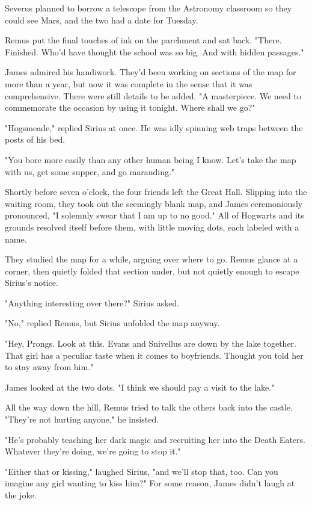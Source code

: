 \documentclass[a4paper,11pt]{article}
\begin{document}
Severus planned to borrow a telescope from the Astronomy classroom so they could see Mars, and the two had a date for Tuesday.

Remus put the final touches of ink on the parchment and sat back. "There. Finished. Who'd have thought the school was so big. And with hidden passages."

James admired his handiwork. They'd been working on sections of the map for more than a year, but now it was complete in the sense that it was comprehensive. There were still details to be added. "A masterpiece. We need to commemorate the occasion by using it tonight. Where shall we go?"

"Hogsmeade," replied Sirius at once. He was idly spinning web traps between the posts of his bed.

"You bore more easily than any other human being I know. Let's take the map with us, get some supper, and go marauding."

Shortly before seven o'clock, the four friends left the Great Hall. Slipping into the waiting room, they took out the seemingly blank map, and James ceremoniously pronounced, "I solemnly swear that I am up to no good." All of Hogwarts and its grounds resolved itself before them, with little moving dots, each labeled with a name.

They studied the map for a while, arguing over where to go. Remus glance at a corner, then quietly folded that section under, but not quietly enough to escape Sirius's notice.

"Anything interesting over there?" Sirius asked.

"No," replied Remus, but Sirius unfolded the map anyway.

"Hey, Prongs. Look at this. Evans and Snivellus are down by the lake together. That girl has a peculiar taste when it comes to boyfriends. Thought you told her to stay away from him."

James looked at the two dots. "I think we should pay a visit to the lake."

All the way down the hill, Remus tried to talk the others back into the castle. "They're not hurting anyone," he insisted.

"He's probably teaching her dark magic and recruiting her into the Death Eaters. Whatever they're doing, we're going to stop it."

"Either that or kissing," laughed Sirius, "and we'll stop that, too. Can you imagine any girl wanting to kiss him?" For some reason, James didn't laugh at the joke.
\end{document}
